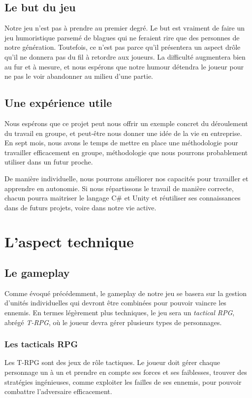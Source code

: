 \documentclass{article}
\begin{document}
\subsection{Le but du jeu}
Notre jeu n'est pas à prendre au premier degré. Le but est vraiment de faire un jeu humoristique parsemé de blagues qui ne feraient rire que des personnes de notre génération. Toutefois, ce n'est pas parce qu'il présentera un aspect drôle qu'il ne donnera pas du fil à retordre aux joueurs. La difficulté augmentera bien au fur et à mesure, et nous espérons que notre humour détendra le joueur pour ne pas le voir abandonner au milieu d'une partie.

\subsection{Une expérience utile}
Nous espérons que ce projet peut nous offrir un exemple concret du déroulement du travail en groupe, et peut-être nous donner une idée de la vie en entreprise. En sept mois, nous avons le temps de mettre en place une méthodologie pour travailler efficacement en groupe, méthodologie que nous pourrons probablement utiliser dans un futur proche.

De manière individuelle, nous pourrons améliorer nos capacités pour travailler et apprendre en autonomie. Si nous répartissons le travail de manière correcte, chacun pourra maitriser le langage C\# et Unity et réutiliser ses connaissances dans de futurs projets, voire dans notre vie active.

\section{L'aspect technique}
\subsection{Le gameplay}
Comme évoqué précédemment, le gameplay de notre jeu se basera sur la gestion d'unités individuelles qui devront être combinées pour pouvoir vaincre les ennemis. En termes légèrement plus techniques, le jeu sera un \textit{tactical RPG}, abrégé \textit{T-RPG}, où le joueur devra gérer plusieurs types de personnages.

\subsubsection{Les tacticals RPG}
Les T-RPG sont des jeux de rôle tactiques. Le joueur doit gérer chaque personnage un à un et prendre en compte ses forces et ses faiblesses, trouver des stratégies ingénieuses, comme exploiter les failles de ses ennemis, pour pouvoir combattre l'adversaire efficacement.\\
\end{document}
